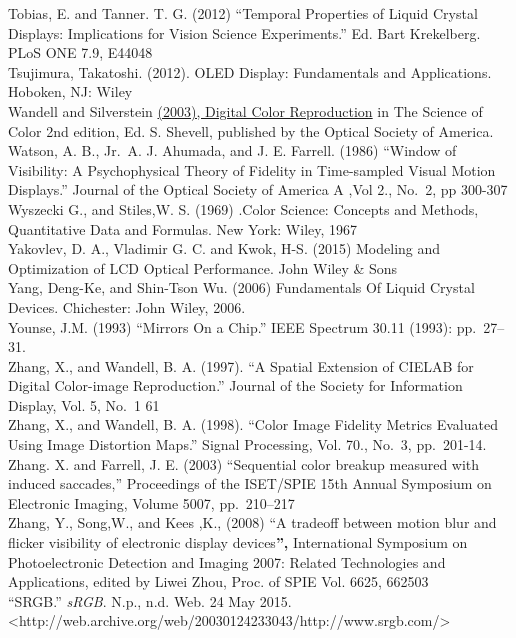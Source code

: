 \documentclass[
  letterpaper,
]{book}
\begin{document}
Tobias, E. and Tanner. T. G. (2012) ``Temporal Properties of Liquid
Crystal Displays: Implications for Vision Science Experiments.'' Ed.
Bart Krekelberg. PLoS ONE 7.9, E44048\\
Tsujimura, Takatoshi. (2012). OLED Display: Fundamentals and
Applications. Hoboken, NJ: Wiley\\
Wandell and Silverstein
\href{http://white.stanford.edu/~brian/papers/pdc/OsaHandBookChapter.pdf}{(2003),
Digital Color Reproduction} in The Science of Color 2nd edition, Ed. S.
Shevell, published by the Optical Society of America.\\
Watson, A. B., Jr.~A. J. Ahumada, and J. E. Farrell. (1986) ``Window of
Visibility: A Psychophysical Theory of Fidelity in Time-sampled Visual
Motion Displays.'' Journal of the Optical Society of America A ,Vol 2.,
No.~2, pp 300-307\\
Wyszecki G., and Stiles,W. S. (1969) .Color Science: Concepts and
Methods, Quantitative Data and Formulas. New York: Wiley, 1967\\
Yakovlev, D. A., Vladimir G. C. and Kwok, H-S. (2015) Modeling and
Optimization of LCD Optical Performance. John Wiley \& Sons\\
Yang, Deng-Ke, and Shin-Tson Wu. (2006) Fundamentals Of Liquid Crystal
Devices. Chichester: John Wiley, 2006.\\
Younse, J.M. (1993) ``Mirrors On a Chip.'' IEEE Spectrum 30.11 (1993):
pp.~27--31.\\
Zhang, X., and Wandell, B. A. (1997). ``A Spatial Extension of CIELAB
for Digital Color-image Reproduction.'' Journal of the Society for
Information Display, Vol. 5, No.~1 61\\
Zhang, X., and Wandell, B. A. (1998). ``Color Image Fidelity Metrics
Evaluated Using Image Distortion Maps.'' Signal Processing, Vol. 70.,
No.~3, pp.~201-14.\\
Zhang. X. and Farrell, J. E. (2003) ``Sequential color breakup measured
with induced saccades,'' Proceedings of the ISET/SPIE 15th Annual
Symposium on Electronic Imaging, Volume 5007, pp.~210--217\\
Zhang, Y., Song,W., and Kees ,K., (2008) ``A tradeoff between motion
blur and flicker visibility of electronic display devices\textbf{'',}
International Symposium on Photoelectronic Detection and Imaging 2007:
Related Technologies and Applications, edited by Liwei Zhou, Proc. of
SPIE Vol. 6625, 662503\\
``SRGB.'' \emph{sRGB}. N.p., n.d. Web. 24 May 2015.
\textless http://web.archive.org/web/20030124233043/http://www.srgb.com/\textgreater{}
\end{document}
